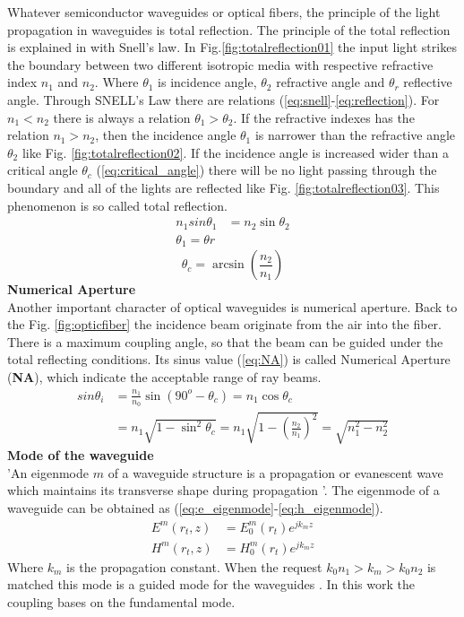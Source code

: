 Whatever semiconductor waveguides or optical fibers, the principle of the light propagation in waveguides is total reflection. The principle of the total reflection is explained in \cite{optical_waveguides_fibers} with Snell's law. In Fig.\ref{fig:totalreflection01} the input light strikes the boundary between two different isotropic media with respective refractive index $n_{1}$ and $n_{2}$. Where $\theta_{1}$ is incidence angle, $\theta_{2}$ refractive angle and $\theta_{r}$ reflective angle. Through SNELL's Law there are relations (\ref{eq:snell}-\ref{eq:reflection}).  For $n_{1}<n_{2}$ there is  always a relation $\theta_{1}>\theta_{2}$.  If the refractive indexes has the relation $n_{1}>n_{2}$, then the incidence angle $\theta_{1}$ is narrower than the refractive angle $\theta_{2}$ like Fig. \ref{fig:totalreflection02}. If the incidence angle is increased wider than a critical angle $\theta_{c}$ (\ref{eq:critical_angle}) there will be no light passing through the boundary and all of the lights are reflected like Fig. \ref{fig:totalreflection03}. This phenomenon is so called total reflection.\\
\begin{align}
n_{1}sin\theta_{1}&=n_{2}\sin\theta_{2}
\label{eq:snell}\\
\theta_{1}=\theta{r}
\label{eq:reflection}
\end{align}
\begin{equation}
\theta_{c}=\arcsin(\frac{n_{2}}{n_{1}})
\label{eq:critical_angle}
\end{equation}
\textbf{ Numerical Aperture }\\
Another important character of optical waveguides is numerical aperture. Back to the Fig. \ref{fig:opticfiber} the incidence beam originate from the air into the fiber. There is a maximum coupling angle, so that the beam can be guided under the total reflecting conditions. Its sinus value (\ref{eq:NA}) is called Numerical Aperture (\textbf{NA}), which indicate the acceptable range of ray beams.
\begin{align}
sin\theta_{i}&=\frac{n_{1}}{n_{0}}\sin(90^{o}-\theta_{c})=n_{1}\cos\theta_{c} \nonumber\\
&=n_{1}\sqrt{1-\sin^{2}\theta_{c}}=n_{1}\sqrt{1-\left(\frac{n_{2}}{n_{1}}\right)^2}=\sqrt{n^2_{1}-n^2_{2}}
\label{eq:NA}
\end{align}
\textbf{Mode of the waveguide}\\
'An eigenmode $m$ of a waveguide structure is a propagation or evanescent wave which maintains its transverse shape during propagation '\cite{integrated_optics}. The eigenmode of a waveguide can be obtained as (\ref{eq:e_eigenmode}-\ref{eq:h_eigenmode}). 
\begin{align}
E^{m}(r_{t},z)&=E^{m}_{0}(r_{t})e^{jk_{m}z}
\label{eq:e_eigenmode}\\
H^{m}(r_{t},z)&=H^{m}_{0}(r_{t})e^{jk_{m}z}
\label{eq:h_eigenmode}
\end{align}
Where $k_{m}$ is the propagation constant. When the request  $k_{0}n_{1}>k_{m}>k_{0}n_{2}$ is matched this mode is a guided mode for the waveguides \cite{script_FT_TET}. In this work the coupling bases on the fundamental mode.
